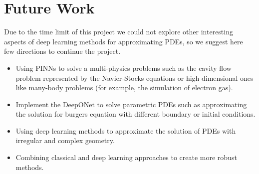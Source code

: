 \documentclass[a4paper,12pt]{article}
\theoremstyle{definition}
\begin{document}
\section*{Future Work}
Due to the time limit of this project we could not explore other interesting aspects 
of deep learning methods for approximating PDEs, so we suggest here few directions 
to continue the project.
\begin{itemize}
    \item Using PINNs to solve a multi-physics problems such as 
    the cavity flow problem represented by the Navier-Stocks equations or high dimensional ones 
    like many-body problems (for example, the simulation of electron gas).
    
    \item Implement the DeepONet to solve parametric PDEs such as approximating the 
    solution for burgers equation with different boundary or initial conditions.

    \item  Using deep learning methods to approximate the solution of PDEs with irregular 
    and complex geometry.

    \item Combining classical and deep learning approaches to create more robust methods.
\end{itemize}
 


%

\clearpage
\singlespacing


 
\end{document}
